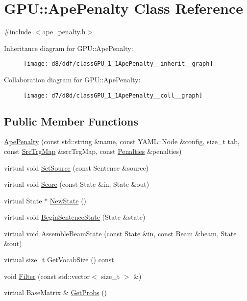 \hypertarget{classGPU_1_1ApePenalty}{}\section{G\+PU\+:\+:Ape\+Penalty Class Reference}
\label{classGPU_1_1ApePenalty}


{\ttfamily \#include $<$ape\+\_\+penalty.\+h$>$}



Inheritance diagram for G\+PU\+:\+:Ape\+Penalty\+:
\nopagebreak
\begin{figure}[H]
\begin{center}
\leavevmode
\texttt{[image: d8/ddf/classGPU\_1\_1ApePenalty\_\_inherit\_\_graph]}
\end{center}
\end{figure}


Collaboration diagram for G\+PU\+:\+:Ape\+Penalty\+:
\nopagebreak
\begin{figure}[H]
\begin{center}
\leavevmode
\texttt{[image: d7/d8d/classGPU\_1\_1ApePenalty\_\_coll\_\_graph]}
\end{center}
\end{figure}
\subsection*{Public Member Functions}
\begin{DoxyCompactItemize}
\item 
\hyperlink{classGPU_1_1ApePenalty_a83488f2624845fda223b786277a04070}{Ape\+Penalty} (const std\+::string \&name, const Y\+A\+M\+L\+::\+Node \&config, size\+\_\+t tab, const \hyperlink{namespaceGPU_af00d3987455a7200ce4556e53eb3d228}{Src\+Trg\+Map} \&src\+Trg\+Map, const \hyperlink{namespaceGPU_ac29cf59ddc71f2086318cc8a5b166269}{Penalties} \&penalties)
\item 
virtual void \hyperlink{classGPU_1_1ApePenalty_ab8b121e02ceba70adcdcf70989bf2799}{Set\+Source} (const Sentence \&source)
\item 
virtual void \hyperlink{classGPU_1_1ApePenalty_a7a7122eb1b3216f57cfafcc66a908fbc}{Score} (const State \&in, State \&out)
\item 
virtual State $\ast$ \hyperlink{classGPU_1_1ApePenalty_a066a608aaca6db9ba49bd42554cdb6be}{New\+State} ()
\item 
virtual void \hyperlink{classGPU_1_1ApePenalty_a1eb9aeaaae7584490e9663c4942e841a}{Begin\+Sentence\+State} (State \&state)
\item 
virtual void \hyperlink{classGPU_1_1ApePenalty_a3910e3567c1645ab417e05bc673baa30}{Assemble\+Beam\+State} (const State \&in, const Beam \&beam, State \&out)
\item 
virtual size\+\_\+t \hyperlink{classGPU_1_1ApePenalty_ab9831d9a76f171017038f75ec0782770}{Get\+Vocab\+Size} () const 
\item 
void \hyperlink{classGPU_1_1ApePenalty_aa87b18d414bede8e6cb238ccf2a99077}{Filter} (const std\+::vector$<$ size\+\_\+t $>$ \&)
\item 
virtual Base\+Matrix \& \hyperlink{classGPU_1_1ApePenalty_a2ca72a0f526af45b6b75bcd1115f91dc}{Get\+Probs} ()
\end{DoxyCompactItemize}
